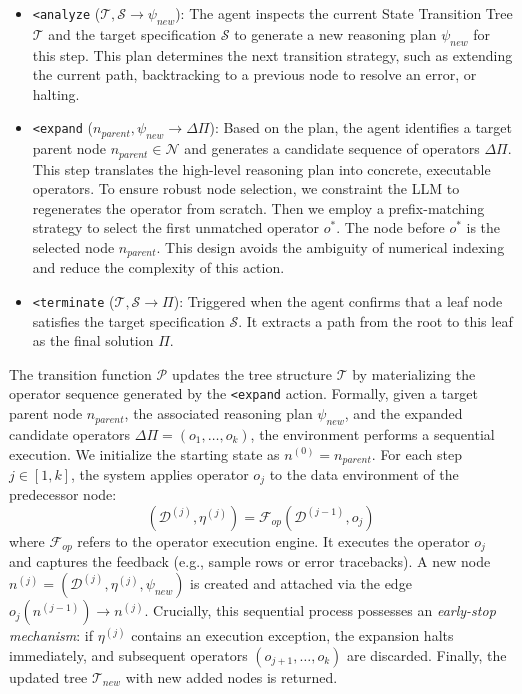 \begin{itemize}[leftmargin=1em]
\item \texttt{<analyze} ($\mathcal{T}, \mathcal{S} \to \psi_{new}$): The agent inspects the current State Transition Tree $\mathcal{T}$ and the target specification $\mathcal{S}$ to generate a new reasoning plan $\psi_{new}$ for this step. This plan determines the next transition strategy, such as extending the current path, backtracking to a previous node to resolve an error, or halting.
\item \texttt{<expand} ($n_{parent}, \psi_{new} \to \Delta \Pi$): Based on the plan, the agent identifies a target parent node $n_{parent} \in \mathcal{N}$ and generates a candidate sequence of operators $\Delta \Pi$. This step translates the high-level reasoning plan into concrete, executable operators. To ensure robust node selection, we constraint the LLM to regenerates the operator from scratch. Then we employ a prefix-matching strategy to select the first unmatched operator $o^*$. The node before $o^*$ is the selected node $n_{parent}$. This design avoids the ambiguity of numerical indexing~\cite{wallace2019nlp} and reduce the complexity of this action.
\item \texttt{<terminate} ($\mathcal{T}, \mathcal{S} \to \Pi$): Triggered when the agent confirms that a leaf node satisfies the target specification $\mathcal{S}$. It extracts a path from the root to this leaf as the final solution $\Pi$.
\end{itemize}

The transition function $\mathcal{P}$ updates the tree structure $\mathcal{T}$ by materializing the operator sequence generated by the \texttt{<expand} action. 
Formally, given a target parent node $n_{parent}$, the associated reasoning plan $\psi_{new}$, and the expanded candidate operators $\Delta \Pi = (o_1, \dots, o_k)$, the environment performs a sequential execution.
We initialize the starting state as $n^{(0)} = n_{parent}$. For each step $j \in [1, k]$, the system applies operator $o_j$ to the data environment of the predecessor node:
$$
(\mathcal{D}^{(j)}, \eta^{(j)}) = \mathcal{F}_{op}(\mathcal{D}^{(j-1)}, o_j)
$$
where $\mathcal{F}_{op}$ refers to the operator execution engine. It executes the operator $o_j$ and captures the feedback (e.g., sample rows or error tracebacks). 
A new node $n^{(j)} = (\mathcal{D}^{(j)}, \eta^{(j)}, \psi_{new})$ is created and attached via the edge $o_j(n^{(j-1)}) \rightarrow n^{(j)}$.
Crucially, this sequential process possesses an \textit{early-stop mechanism}: if $\eta^{(j)}$ contains an execution exception, the expansion halts immediately, and subsequent operators $(o_{j+1}, \dots, o_k)$ are discarded. Finally, the updated tree $\mathcal{T}_{new}$ with new added nodes is returned.


